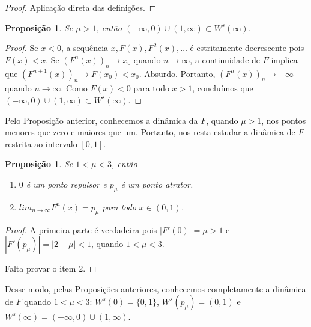 \documentclass[a4paper, 12pt]{article}
\theoremstyle{definition}
\theoremstyle{plain}
\newtheorem{proposition}[definition]{Proposição}
\theoremstyle{plain}
\theoremstyle{plain}
\theoremstyle{remark}
\begin{document}
\begin{proof}
Aplicação direta das definições.
\end{proof}

\begin{proposition}
\label{proposition 3 1}
Se $\mu > 1$, então $(-\infty, 0) \cup (1, \infty) \subset W^s(\infty)$.
\end{proposition}

\begin{proof}
Se $x < 0$, a sequência  $x, F(x), F^2(x), \dots$ é estritamente decrescente pois  $F(x) < x$. Se $(F^n(x))_n \longrightarrow x_0$ quando $n \longrightarrow \infty$, a continuidade de $F$ implica que $(F^{n+1}(x))_n \longrightarrow F (x_0) < x_0$. Absurdo. Portanto, $(F^n(x))_n \longrightarrow -\infty$ quando $n \longrightarrow \infty$. Como $F(x) < 0$ para todo $x > 1$, concluímos que $(-\infty, 0) \cup (1, \infty) \subset W^s(\infty)$.
\end{proof}

Pelo Proposição anterior, conhecemos a dinâmica da $F$, quando $\mu > 1$, nos pontos menores que zero e maiores que um. Portanto, nos resta estudar a dinâmica de $F$ restrita ao intervalo $[0, 1]$.

\begin{proposition}
Se $1 < \mu < 3$, então
\begin{enumerate}
\item $0$ é um ponto repulsor e $p_\mu$ é um ponto atrator.
\item $lim_{n \rightarrow \infty} F^n(x) = p_\mu$ para todo $x \in (0, 1)$.
\end{enumerate}
\end{proposition}

\begin{proof}
A primeira parte é verdadeira pois $|F'(0)| = \mu > 1$ e $|F'(p_\mu)| = |2 - \mu| < 1$, quando $1 < \mu < 3$.

Falta provar o item 2.
\end{proof}

Desse modo, pelas Proposições anteriores, conhecemos completamente a dinâmica de $F$ quando $1 < \mu < 3$: $W^s(0) = \{0, 1\}$, $W^s(p_\mu) = (0, 1)$ e $W^s(\infty) = (-\infty, 0) \cup (1, \infty)$.
\end{document}
